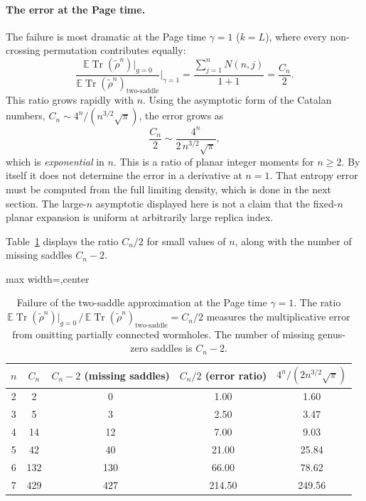 \documentclass[11pt,letterpaper]{article}
\theoremstyle{plain}
\theoremstyle{definition}
\theoremstyle{remark}
\begin{document}
\paragraph{The error at the Page time.}
The failure is most dramatic at the Page time $\gamma = 1$ ($k = L$), where
every non-crossing permutation contributes equally:
\begin{equation}
\label{eq06:page_time_error}
\frac{\mathbb E\operatorname{Tr}(\widetilde\rho^n)\big|_{g=0}}
     {\mathbb E\operatorname{Tr}(\widetilde\rho^n)_{\text{two-saddle}}} \bigg|_{\gamma = 1}
= \frac{\sum_{j=1}^{n} N(n,j)}{1 + 1}
= \frac{C_n}{2}.
\end{equation}
This ratio grows rapidly with $n$.  Using the asymptotic form of the Catalan
numbers, $C_n \sim 4^n / (n^{3/2}\sqrt{\pi})$, the error grows as
\begin{equation}
\label{eq06:error_asymptotics}
\frac{C_n}{2} \sim \frac{4^n}{2\,n^{3/2}\sqrt{\pi}},
\end{equation}
which is \emph{exponential} in $n$.  This is a ratio of planar integer moments for $n\geq2$.  By itself it does
not determine the error in a derivative at $n=1$.  That entropy error must be
computed from the full limiting density, which is done in the next section.
The large-$n$ asymptotic displayed here is not a claim that the fixed-$n$
planar expansion is uniform at arbitrarily large replica index.

Table~\ref{tab06:two_saddle_error} displays the ratio $C_n/2$ for small
values of $n$, along with the number of missing saddles $C_n - 2$.

\begin{table}[htbp]
\centering
\caption{Failure of the two-saddle approximation at the Page time
$\gamma = 1$.  The ratio
$\mathbb E\operatorname{Tr}(\widetilde\rho^n)|_{g=0}\,/\,\mathbb E\operatorname{Tr}(\widetilde\rho^n)_{\text{two-saddle}}
= C_n/2$ measures the multiplicative error from omitting partially connected
wormholes.  The number of missing genus-zero saddles is $C_n - 2$.}
\label{tab06:two_saddle_error}
\begin{adjustbox}{max width=\textwidth,center}
\begin{tabular}{c c c c c}
\hline\hline
$n$ & $C_n$ & $C_n - 2$ (missing saddles) &
  $C_n/2$ (error ratio) & $4^n/(2n^{3/2}\sqrt{\pi})$ \\
\hline
2 & 2  & 0   & 1.00  & 1.60 \\
3 & 5  & 3   & 2.50  & 3.47 \\
4 & 14 & 12  & 7.00  & 9.03 \\
5 & 42 & 40  & 21.00 & 25.84 \\
6 & 132 & 130 & 66.00 & 78.62 \\
7 & 429 & 427 & 214.50 & 249.56 \\
\hline\hline
\end{tabular}
\end{adjustbox}
\end{table}
\end{document}
